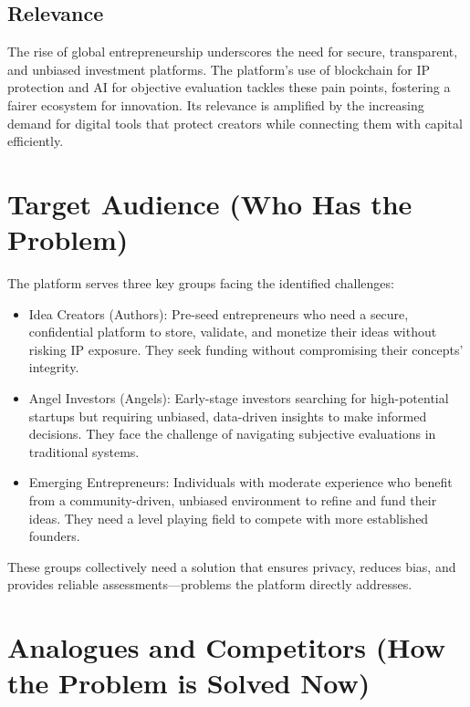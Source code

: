 \documentclass[12pt]{article}
\begin{document}
\subsection{Relevance}
The rise of global entrepreneurship underscores the need for secure, transparent, and unbiased investment platforms. The platform's use of blockchain for IP protection and AI for objective evaluation tackles these pain points, fostering a fairer ecosystem for innovation. Its relevance is amplified by the increasing demand for digital tools that protect creators while connecting them with capital efficiently.

\section{Target Audience (Who Has the Problem)}

The platform serves three key groups facing the identified challenges:

\begin{itemize}
  \item Idea Creators (Authors): Pre-seed entrepreneurs who need a secure, confidential platform to store, validate, and monetize their ideas without risking IP exposure. They seek funding without compromising their concepts' integrity.
  \item Angel Investors (Angels): Early-stage investors searching for high-potential startups but requiring unbiased, data-driven insights to make informed decisions. They face the challenge of navigating subjective evaluations in traditional systems.
  \item Emerging Entrepreneurs: Individuals with moderate experience who benefit from a community-driven, unbiased environment to refine and fund their ideas. They need a level playing field to compete with more established founders.
\end{itemize}

These groups collectively need a solution that ensures privacy, reduces bias, and provides reliable assessments—problems the platform directly addresses.

\section{Analogues and Competitors (How the Problem is Solved Now)}
\end{document}
